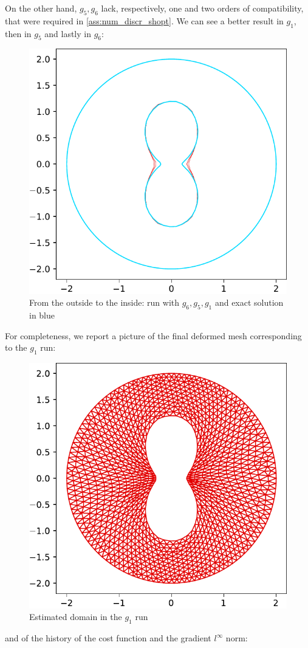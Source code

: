 \documentclass[english,a4paper,9pt,oneside]{scrbook}	%
\theoremstyle{break}
\theoremstyle{remark}
\begin{document}
On the other hand, $g_5,g_6$ lack, respectively, one and two orders of compatibility, that were required in \cref{ass:num_discr_shopt}. We can see a better result in $g_1$, then in $g_5$ and lastly in $g_6$:

\begin{figure}[H]
\centering
\includegraphics[width=0.2\columnwidth]{Images/hourglass_constant_1_2_cropped.pdf}
\caption{From the outside to the inside: run with $g_6, g_5, g_1$ and exact solution in blue}\label{fig:comparison_compatibility}
\end{figure}


For completeness, we report a picture of the final deformed mesh corresponding to the $g_1$ run:

\begin{figure}[H]
\centering
\includegraphics[width=0.3\columnwidth]{Images/hourglass_constant/estimated_domain.pdf}
\caption{Estimated domain in the $g_1$ run}\label{fig:estimated_domain}
\end{figure}

and of the history of the cost function and the gradient $l^\infty$ norm:
\end{document}
